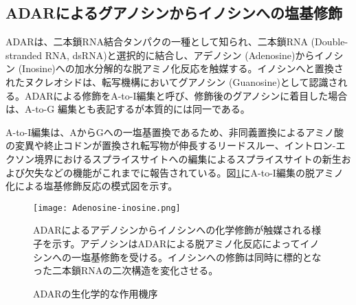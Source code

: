 \subsection{ADARによるグアノシンからイノシンへの塩基修飾}
ADARは、二本鎖RNA結合タンパクの一種として知られ、二本鎖RNA (Double-stranded RNA, dsRNA)と選択的に結合し、アデノシン (Adenosine)からイノシン (Inosine)への加水分解的な脱アミノ化反応を触媒する。イノシンへと置換されたヌクレオシドは、転写機構においてグアノシン (Guanosine)として認識される。ADARによる修飾をA-to-I編集と呼び、修飾後のグアノシンに着目した場合は、A-to-G 編集とも表記するが本質的には同一である。
\par
A-to-I編集は、AからGへの一塩基置換であるため、非同義置換によるアミノ酸の変異や終止コドンが置換され転写物が伸長するリードスルー、イントロン-エクソン境界におけるスプライスサイトへの編集によるスプライスサイトの新生および欠失などの機能がこれまでに報告されている。図\ref{fig:Chemical_reaction}にA-to-I編集の脱アミノ化による塩基修飾反応の模式図を示す。
\begin{figure}[!htbp]
	\begin{center}
		\texttt{[image: Adenosine-inosine.png]}
	\end{center}
	\caption{ADARの生化学的な作用機序}
	\begin{flushleft}
		\small{ADARによるアデノシンからイノシンへの化学修飾が触媒される様子を示す。アデノシンはADARによる脱アミノ化反応によってイノシンへの一塩基修飾を受ける。イノシンへの修飾は同時に標的となった二本鎖RNAの二次構造を変化させる。}
	\end{flushleft}
	\label{fig:Chemical_reaction}
\end{figure}


